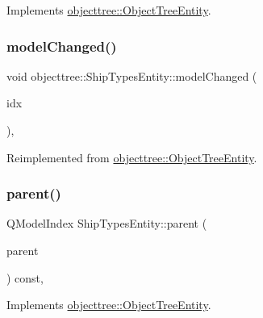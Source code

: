 Implements \mbox{\hyperlink{classobjecttree_1_1_object_tree_entity_a9ccaab3b27e65b1ed8b22f00c57a1082}{objecttree\+::\+Object\+Tree\+Entity}}.

\mbox{\label{classobjecttree_1_1_ship_types_entity_ac6de6e4f2f20d054cfb956d7bc8cf875}} 
\subsubsection{\texorpdfstring{modelChanged()}{modelChanged()}}
{\footnotesize\ttfamily void objecttree\+::\+Ship\+Types\+Entity\+::model\+Changed (\begin{DoxyParamCaption}\item[{int}]{idx }\end{DoxyParamCaption})\hspace{0.3cm}{\ttfamily [override]}, {\ttfamily [virtual]}}



Reimplemented from \mbox{\hyperlink{classobjecttree_1_1_object_tree_entity_a167db83e542f7e9e760e7e2a5548cc3a}{objecttree\+::\+Object\+Tree\+Entity}}.

\mbox{\label{classobjecttree_1_1_ship_types_entity_ac5bf78e5a3d23e5db7b6ea0046f55ccb}} 
\subsubsection{\texorpdfstring{parent()}{parent()}}
{\footnotesize\ttfamily Q\+Model\+Index Ship\+Types\+Entity\+::parent (\begin{DoxyParamCaption}\item[{const Q\+Model\+Index \&}]{parent }\end{DoxyParamCaption}) const\hspace{0.3cm}{\ttfamily [override]}, {\ttfamily [virtual]}}



Implements \mbox{\hyperlink{classobjecttree_1_1_object_tree_entity_a2d1b13c056476f87637aacd7e99e7305}{objecttree\+::\+Object\+Tree\+Entity}}.

